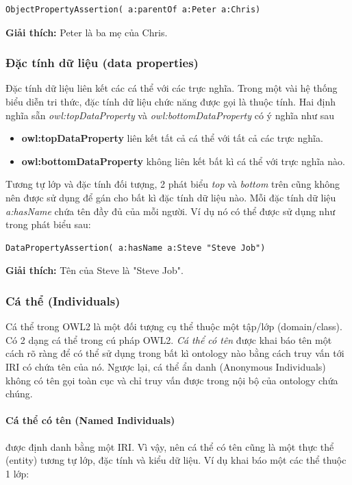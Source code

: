\begin{verbatim}
ObjectPropertyAssertion( a:parentOf a:Peter a:Chris)  
\end{verbatim}

\textbf{Giải thích:} Peter là ba mẹ của Chris.

\subsubsection{Đặc tính dữ liệu (data properties)}
Đặc tính dữ liệu liên kết các cá thể với các trực nghĩa. Trong một vài hệ thống biểu diễn tri thức, đặc tính dữ liệu chức năng được gọi là thuộc tính.
Hai định nghĩa sẵn \textit{owl:topDataProperty} và \textit{owl:bottomDataProperty} có ý nghĩa như sau
\begin{itemize}
\item \textbf{owl:topDataProperty} liên kết tất cả cá thể với tất cả các trực nghĩa.
\item \textbf{owl:bottomDataProperty} không liên kết bất kì cá thể với trực nghĩa nào.
\end{itemize}
Tương tự lớp và đặc tính đối tượng, 2 phát biểu \textit{top} và \textit{bottom} trên cũng không nên được sử dụng để gán cho bất kì đặc tính dữ liệu nào. Mỗi đặc tính dữ liệu \textit{a:hasName} chứa tên đầy đủ của mỗi người. Ví dụ nó có thể được sử dụng như trong phát biểu sau:

\begin{verbatim}
DataPropertyAssertion( a:hasName a:Steve "Steve Job") 
\end{verbatim}

\textbf{Giải thích:} Tên của Steve là "Steve Job".

\subsubsection{Cá thể (Individuals)}
Cá thể trong OWL2 là một đối tượng cụ thể thuộc một tập/lớp (domain/class). Có 2 dạng cá thể trong cú pháp OWL2. \textit{Cá thể có tên} được khai báo tên một cách rõ ràng để có thể sử dụng trong bất kì ontology nào bằng cách truy vấn tới IRI có chứa tên của nó. Ngược lại, cá thể ẩn danh (Anonymous Individuals) không có tên gọi toàn cục và chỉ truy vấn được trong nội bộ của ontology chứa chúng.

\paragraph{Cá thể có tên (Named Individuals)} được định danh bằng một IRI. Vì vậy, nên cá thể có tên cũng là một thực thể (entity) tương tự lớp, đặc tính và kiểu dữ liệu. Ví dụ khai báo một các thể thuộc 1 lớp:

